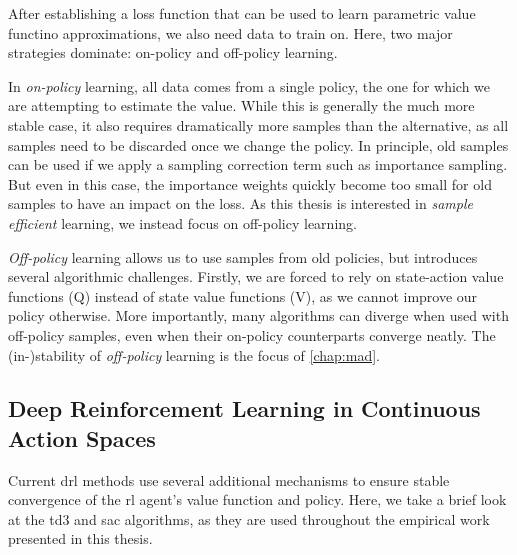 After establishing a loss function that can be used to learn parametric value functino approximations, we also need data to train on.
Here, two major strategies dominate: on-policy and off-policy learning.

In \emph{on-policy} learning, all data comes from a single policy, the one for which we are attempting to estimate the value.
While this is generally the much more stable case, it also requires dramatically more samples than the alternative, as all samples need to be discarded once we change the policy.
In principle, old samples can be used if we apply a sampling correction term such as importance sampling.
But even in this case, the importance weights quickly become too small for old samples to have an impact on the loss.
As this thesis is interested in \emph{sample efficient} learning, we instead focus on off-policy learning.

\emph{Off-policy} learning allows us to use samples from old policies, but introduces several algorithmic challenges.
Firstly, we are forced to rely on state-action value functions (Q) instead of state value functions (V), as we cannot improve our policy otherwise.
More importantly, many algorithms can diverge when used with off-policy samples, even when their on-policy counterparts converge neatly.
The (in-)stability of \emph{off-policy} learning is the focus of \autoref{chap:mad}.

\subsection{Deep Reinforcement Learning in Continuous Action Spaces}


Current \ac{drl} methods use several additional mechanisms to ensure stable convergence of the \ac{rl} agent's value function and policy.
Here, we take a brief look at the \ac{td3} and \ac{sac} algorithms, as they are used throughout the empirical work presented in this thesis.

